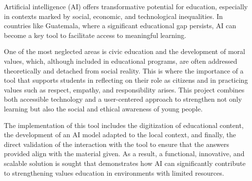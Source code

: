 Artificial intelligence (AI) offers transformative potential for education,
especially in contexts marked by social, economic, and technological
inequalities. In countries like Guatemala, where a significant educational gap
persists, AI can become a key tool to facilitate access to meaningful learning.

One of the most neglected areas is civic education and the development of moral
values, which, although included in educational programs, are often addressed
theoretically and detached from social reality. This is where the importance of
a tool that supports students in reflecting on their role as citizens and in
practicing values such as respect, empathy, and responsibility arises. This
project combines both accessible technology and a user-centered approach to
strengthen not only learning but also the social and ethical awareness of young
people.

The implementation of this tool includes the digitization of educational
content, the development of an AI model adapted to the local context, and
finally, the direct validation of the interaction with the tool to ensure that
the answers provided align with the material given. As a result, a functional,
innovative, and scalable solution is sought that demonstrates how AI can
significantly contribute to strengthening values education in environments with
limited resources.